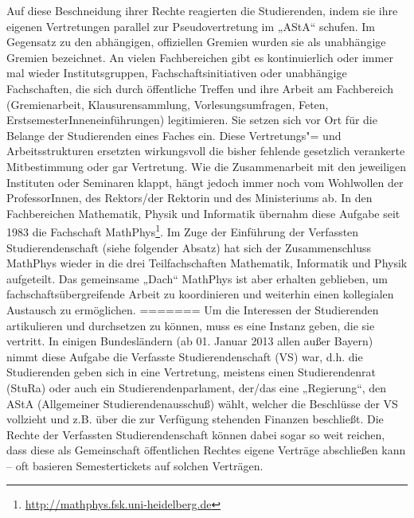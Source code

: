 Auf diese Beschneidung ihrer Rechte reagierten die Studierenden, indem sie ihre
eigenen Vertretungen parallel zur Pseudovertretung im „AStA“ schufen. Im
Gegensatz zu den abhängigen, offiziellen Gremien wurden sie als unabhängige
Gremien bezeichnet.  An vielen Fachbereichen gibt es kontinuierlich oder immer
mal wieder Institutsgruppen, Fachschaftsinitiativen oder unabhängige
Fachschaften, die sich durch öffentliche Treffen und ihre Arbeit am Fachbereich
(Gremienarbeit, Klausurensammlung, Vorlesungsumfragen, Feten,
ErstsemesterInneneinführungen) legitimieren. Sie setzen sich vor Ort für die
Belange der Studierenden eines Faches ein. Diese Vertretungs"= und
Arbeitsstrukturen ersetzten wirkungsvoll die bisher fehlende gesetzlich
verankerte Mitbestimmung oder gar Vertretung. Wie die Zusammenarbeit mit den
jeweiligen Instituten oder Seminaren klappt, hängt jedoch immer noch vom
Wohlwollen der ProfessorInnen, des Rektors/der Rektorin und des Ministeriums
ab. In den Fachbereichen Mathematik, Physik und Informatik übernahm diese
Aufgabe seit 1983 die Fachschaft
MathPhys\footnote{\url{http://mathphys.fsk.uni-heidelberg.de}}.  Im Zuge der
Einführung der Verfassten Studierendenschaft (siehe folgender Absatz) hat sich
der Zusammenschluss MathPhys wieder in die drei Teilfachschaften Mathematik,
Informatik und Physik aufgeteilt.  Das gemeinsame „Dach“ MathPhys ist aber
erhalten geblieben, um fachschaftsübergreifende Arbeit zu koordinieren und
weiterhin einen kollegialen Austausch zu ermöglichen.
=======
Um die Interessen der Studierenden artikulieren und durchsetzen zu können,
muss es eine Instanz geben, die sie vertritt. In einigen Bundesländern
(ab 01. Januar 2013 allen außer Bayern) nimmt diese Aufgabe die
Verfasste Studierendenschaft (VS) war, d.h. die Studierenden geben sich
in eine Vertretung, meistens einen Studierendenrat (StuRa)
oder auch ein Studierendenparlament, der/das eine „Regierung“, den AStA
(Allgemeiner Studierendenausschuß) wählt, welcher die Beschlüsse der VS
vollzieht und z.B. über die zur Verfügung stehenden Finanzen beschließt.
Die Rechte der Verfassten Studierendenschaft können dabei sogar so weit
reichen, dass diese als Gemeinschaft öffentlichen Rechtes eigene Verträge
abschließen kann -- oft basieren Semestertickets auf solchen Verträgen.

